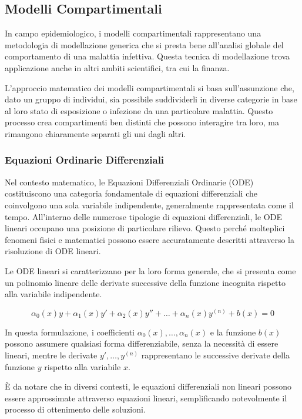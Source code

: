 \subsection{Modelli Compartimentali}

In campo epidemiologico, i modelli compartimentali rappresentano una 
metodologia di modellazione generica che si presta bene all'analisi 
globale del comportamento di una malattia infettiva. Questa tecnica di 
modellazione trova applicazione anche in altri ambiti scientifici, tra 
cui la finanza.

L'approccio matematico dei modelli compartimentali si basa sull'assunzione 
che, dato un gruppo di individui, sia possibile suddividerli in diverse 
categorie in base al loro stato di esposizione o infezione da una 
particolare malattia. Questo processo crea compartimenti ben distinti che 
possono interagire tra loro, ma rimangono chiaramente separati gli uni 
dagli altri.

\subsubsection*{Equazioni Ordinarie Differenziali}

Nel contesto matematico, le Equazioni Differenziali Ordinarie (ODE) 
costituiscono una categoria fondamentale di equazioni differenziali 
che coinvolgono una sola variabile indipendente, generalmente 
rappresentata come il tempo. All'interno delle numerose tipologie di 
equazioni differenziali, le ODE lineari occupano una posizione di 
particolare rilievo. Questo perché molteplici fenomeni fisici e 
matematici possono essere accuratamente descritti attraverso la 
risoluzione di ODE lineari.

Le ODE lineari si caratterizzano per la loro forma generale, 
che si presenta come un polinomio lineare delle derivate successive 
della funzione incognita rispetto alla variabile indipendente.

$$\alpha_0(x)y + \alpha_1(x)y' + \alpha_2(x)y'' + \ldots + \alpha_n(x)y^{(n)} + b(x) = 0$$

In questa formulazione, i coefficienti $\alpha_0(x), \ldots, \alpha_n(x)$ 
e la funzione $b(x)$ possono assumere qualsiasi forma differenziabile, 
senza la necessità di essere lineari, mentre le derivate 
$y', \ldots, y^{(n)}$ rappresentano le successive derivate della funzione 
$y$ rispetto alla variabile $x$.

È da notare che in diversi contesti, le equazioni differenziali non 
lineari possono essere approssimate attraverso equazioni lineari, 
semplificando notevolmente il processo di ottenimento delle soluzioni.

